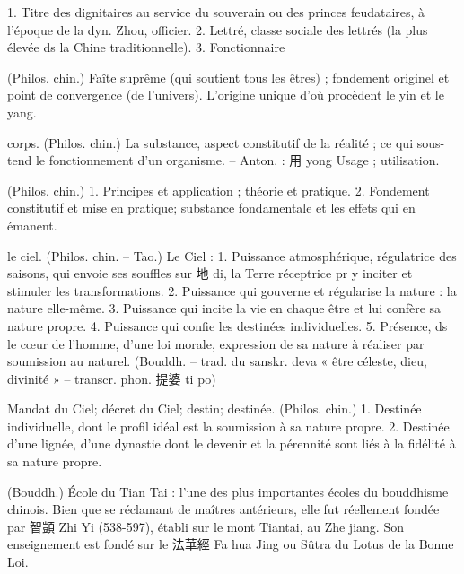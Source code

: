 \begin{Def}[shi 士 ]
    1. Titre des dignitaires au service du souverain ou des princes feudataires, à l’époque de la dyn. Zhou, officier. 2. Lettré, classe sociale des lettrés (la plus élevée ds la Chine traditionnelle). 3. Fonctionnaire 
\end{Def}
 
   
\begin{Def}[taiji 太極 ]
    (Philos. chin.) Faîte suprême (qui soutient tous les êtres) ; fondement originel et point de convergence (de l’univers). L’origine unique d’où procèdent le yin et le yang. 
\end{Def}
\begin{Def}[ti 體]
    corps. (Philos. chin.) La substance, aspect constitutif de la réalité ; ce qui sous-tend le fonctionnement d’un organisme. – Anton. : 用 yong Usage ; utilisation. 
\end{Def}
\begin{Def}[tiyong 體用]
  (Philos. chin.)	1. Principes et application ; théorie et pratique.	  2. Fondement constitutif et mise en pratique; substance fondamentale et les effets qui en émanent. 
\end{Def}
\begin{Def}[tian 天 ]
    le ciel. (Philos. chin. – Tao.) Le Ciel : 1. Puissance atmosphérique, régulatrice des saisons, qui envoie ses souffles sur 地 di, la Terre réceptrice pr y inciter et stimuler les transformations. 2. Puissance qui gouverne et régularise la nature : la nature elle-même. 3. Puissance qui incite la vie en chaque être et lui confère sa nature propre. 4. Puissance qui confie les destinées individuelles. 5. Présence, ds le cœur de l’homme, d’une loi morale, expression de sa nature à réaliser par soumission au naturel. (Bouddh. – trad. du sanskr. deva « être céleste, dieu, divinité » – transcr. phon. 提婆 ti po) 
\end{Def}
\begin{Def}[tianming 天命]
    Mandat du Ciel; décret du Ciel; destin; destinée.	(Philos. chin.) 1. Destinée individuelle, dont le profil idéal est la soumission à sa nature propre. 2. Destinée d’une lignée, d’une dynastie dont le devenir et la pérennité sont liés à la fidélité à sa nature propre. 
\end{Def}
\begin{Def}
    (Bouddh.) École du Tian Tai : l’une des plus importantes écoles du bouddhisme chinois. Bien que se réclamant de maîtres antérieurs, elle fut réellement fondée par 智顗 Zhi Yi (538-597), établi sur le mont Tiantai, au Zhe jiang. Son enseignement est fondé sur le 法華經 Fa hua Jing ou Sûtra du Lotus de la Bonne Loi. 
\end{Def}
